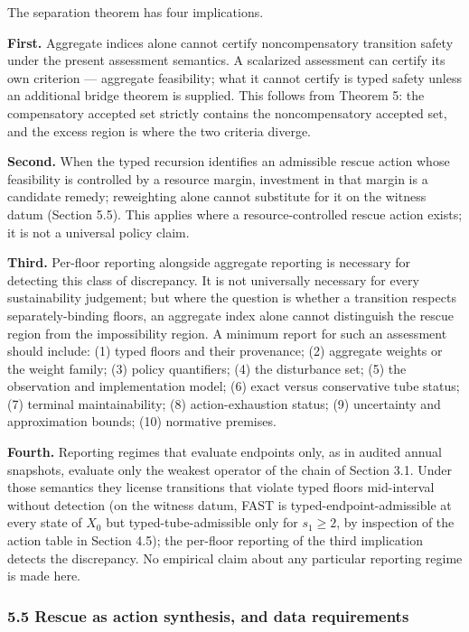 \documentclass[11pt]{article}
\begin{document}
The separation theorem has four implications.

\textbf{First.} Aggregate indices alone cannot certify noncompensatory
transition safety under the present assessment semantics. A scalarized
assessment can certify its own criterion --- aggregate feasibility; what
it cannot certify is typed safety unless an additional bridge theorem is
supplied. This follows from Theorem 5: the compensatory accepted set
strictly contains the noncompensatory accepted set, and the excess
region is where the two criteria diverge.

\textbf{Second.} When the typed recursion identifies an admissible
rescue action whose feasibility is controlled by a resource margin,
investment in that margin is a candidate remedy; reweighting alone cannot substitute for it on the witness datum (Section 5.5). This applies where a resource-controlled rescue action exists; it is not a universal policy claim.

\textbf{Third.} Per-floor reporting alongside aggregate reporting is
necessary for detecting this class of discrepancy. It is not universally
necessary for every sustainability judgement; but where the question is
whether a transition respects separately-binding floors, an aggregate
index alone cannot distinguish the rescue region from the impossibility
region. A minimum report for such an assessment should include: (1)
typed floors and their provenance; (2) aggregate weights or the weight
family; (3) policy quantifiers; (4) the disturbance set; (5) the
observation and implementation model; (6) exact versus conservative tube
status; (7) terminal maintainability; (8) action-exhaustion status; (9)
uncertainty and approximation bounds; (10) normative premises.

\textbf{Fourth.} Reporting regimes that evaluate endpoints only, as in audited annual snapshots, evaluate only the weakest operator of the chain of Section 3.1. Under those semantics they license transitions that violate typed floors mid-interval without detection (on the witness datum, FAST is typed-endpoint-admissible at every state of \(X_0\) but typed-tube-admissible only for \(s_1 \ge 2\), by inspection of the action table in Section 4.5); the per-floor reporting of the third implication detects the discrepancy. No empirical claim about any particular reporting regime is made here.

\subsubsection{5.5 Rescue as action synthesis, and data
requirements}\label{rescue-as-action-synthesis-and-data-requirements}
\end{document}
